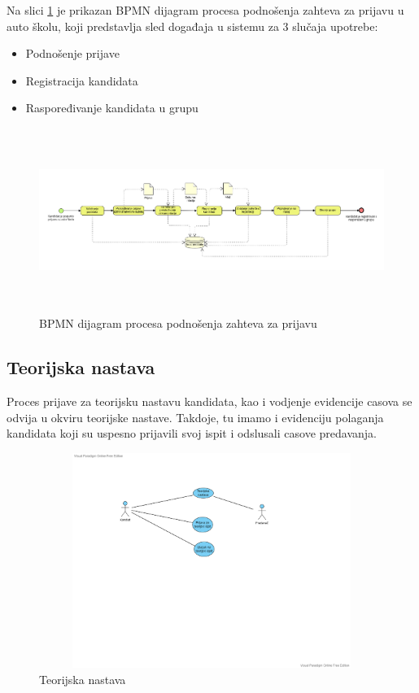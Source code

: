 Na slici \ref{fig:bpmn_podnosenje_zahteva} je prikazan BPMN dijagram procesa podnošenja zahteva za prijavu u auto školu,
koji predstavlja sled događaja u sistemu za 3 slučaja upotrebe:
\begin{itemize}
    \item Podnošenje prijave
    \item Registracija kandidata
    \item Raspoređivanje kandidata u grupu
\end{itemize}

\begin{figure}[H]
    \begin{center}
        \includegraphics[width=120mm, height=60mm]{Diagrams/bpmn_podnosenje_zahteva.png}
    \end{center}
    \caption {BPMN dijagram procesa podnošenja zahteva za prijavu}
    \label{fig:bpmn_podnosenje_zahteva}

\end{figure}


\subsection {Teorijska nastava}
Proces prijave za teorijsku nastavu kandidata, kao i vodjenje evidencije casova se odvija u okviru teorijske nastave. Takdoje, tu imamo i evidenciju polaganja kandidata koji su uspesno prijavili svoj ispit i odslusali casove predavanja.

\begin{figure}[H]
  \begin{center}
      \includegraphics[width=140mm, height=70mm]{Diagrams/diagram teorijska nastava.png}
  \end{center}
  \caption {Teorijska nastava}
  \label{theory}

\end{figure}


